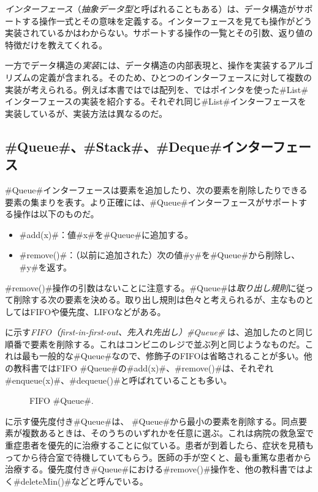 \emph{インターフェース}（\emph{抽象データ型}と呼ばれることもある）は、データ構造がサポートする操作一式とその意味を定義する。インターフェースを見ても操作がどう実装されているかはわからない。サポートする操作の一覧とその引数、返り値の特徴だけを教えてくれる。 %

一方でデータ構造の\emph{実装}には、データ構造の内部表現と、操作を実装するアルゴリズムの定義が含まれる。そのため、ひとつのインターフェースに対して複数の実装が考えられる。例えば本書ではでは配列を、ではポインタを使った#List#インターフェースの実装を紹介する。それぞれ同じ#List#インターフェースを実装しているが、実装方法は異なるのだ。

\subsection{#Queue#、#Stack#、#Deque#インターフェース}

#Queue#インターフェースは要素を追加したり、次の要素を削除したりできる要素の集まりを表す。より正確には、#Queue#インターフェースがサポートする操作は以下のものだ。

\begin{itemize}
  \item #add(x)#：値#x#を#Queue#に追加する。
  \item #remove()#：（以前に追加された）次の値#y#を#Queue#から削除し、#y#を返す。
\end{itemize}

#remove()#操作の引数はないことに注意する。#Queue#は\emph{取り出し規則}に従って削除する次の要素を決める。取り出し規則は色々と考えられるが、主なものとしてはFIFOや優先度、LIFOなどがある。 %

に示す\emph{FIFO（first-in-first-out、先入れ先出し）#Queue#} は、追加したのと同じ順番で要素を削除する。これはコンビニのレジで並ぶ列と同じようなものだ。これは最も一般的な#Queue#なので、修飾子のFIFOは省略されることが多い。他の教科書ではFIFO #Queue#の#add(x)#、#remove()#は、それぞれ#enqueue(x)#、#dequeue()#と呼ばれていることも多い。

\begin{figure}
  \caption[FIFOキュー]{FIFO #Queue#.}
\end{figure}

に示す優先度付き#Queue#は、
%
%
%
#Queue#から最小の要素を削除する。同点要素が複数あるときは、そのうちのいずれかを任意に選ぶ。これは病院の救急室で重症患者を優先的に治療することに似ている。患者が到着したら、症状を見積もってから待合室で待機していてもらう。医師の手が空くと、最も重篤な患者から治療する。優先度付き#Queue#における#remove()#操作を、他の教科書ではよく#deleteMin()#などと呼んでいる。 %

